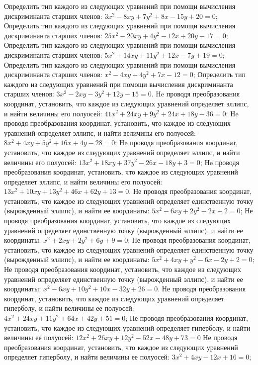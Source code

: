 Определить тип каждого из следующих уравнений при помощи вычисления дискриминанта старших членов: $3 x^2-8 x y+7 y^2+8 x-15 y+20=0$;
Определить тип каждого из следующих уравнений при помощи вычисления дискриминанта старших членов: $25 x^2-20 x y+4 y^2-12 x+20 y-17=0$;
Определить тип каждого из следующих уравнений при помощи вычисления дискриминанта старших членов: $5 x^2+14 x y+11 y^2+12 x-7 y+19=0$;
Определить тип каждого из следующих уравнений при помощи вычисления дискриминанта старших членов: $x^2-4 x y+4 y^2+7 x-12=0$;
Определить тип каждого из следующих уравнений при помощи вычисления дискриминанта старших членов: $3 x^2-2 x y-3 y^2+12 y-15=0$.
He проводя преобразования координат, установить, что каждое из следующих уравнений определяет эллипс, и найти величины его полуосей: $41 x^2+24 x y+9 y^2+24 x+18 y-36=0$;
He проводя преобразования координат, установить, что каждое из следующих уравнений определяет эллипс, и найти величины его полуосей: $8 x^2+4 x y+5 y^2+16 x+4 y-28=0$;
He проводя преобразования координат, установить, что каждое из следующих уравнений определяет эллипс, и найти величины его полуосей: $13 x^2+18 x y+37 y^2-26 x-18 y+3=0$;
He проводя преобразования координат, установить, что каждое из следующих уравнений определяет эллипс, и найти величины его полуосей: $13 x^2+10 x y+13 y^2+46 x+62 y+13=0$.
Не проводя преобразования координат, установить, что каждое из следующих уравнений определяет единственную точку (вырожденный эллипс), и найти ее координаты: $5 x^2-6 x y+2 y^2-2 x+2=0$;
Не проводя преобразования координат, установить, что каждое из следующих уравнений определяет единственную точку (вырожденный эллипс), и найти ее координаты: $x^2+2 x y+2 y^2+6 y+9=0$;
Не проводя преобразования координат, установить, что каждое из следующих уравнений определяет единственную точку (вырожденный эллипс), и найти ее координаты: $5 x^2+4 x y+y^2-6 x-2 y+2=0$;
Не проводя преобразования координат, установить, что каждое из следующих уравнений определяет единственную точку (вырожденный эллипс), и найти ее координаты: $x^2-6 x y+10 y^2+10 x-32 y+26=0$.
Не проводя преобразования координат, установить, что каждое из следующих уравнений определяет гиперболу, и найти величины ее полуосей: $4 x^2+24 x y+11 y^2+64 x+42 y+51=0$;
Не проводя преобразования координат, установить, что каждое из следующих уравнений определяет гиперболу, и найти величины ее полуосей: $12 x^2+26 x y+12 y^2-52 x-48 y+73=0$
Не проводя преобразования координат, установить, что каждое из следующих уравнений определяет гиперболу, и найти величины ее полуосей: $3 x^2+4 x y-12 x+16=0$;
